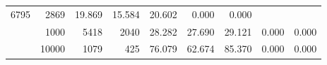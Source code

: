 \begin{table}
\begin{tabular}{rrrrrrrrr}
							     6795  & 2869  
	                           & 19.869 & 15.584 & 20.602
	                           & 0.000 & 0.000  \\
	                
	            
					 &  
					 
					\multirow{ 1 }{*}{ 1000 } &
					
						
							    
							     5418  & 2040  
	                           & 28.282 & 27.690 & 29.121
	                           & 0.000 & 0.000  \\
	                
	            
					 &  
					 
					\multirow{ 1 }{*}{ 10000 } &
					
						
							    
							     1079  & 425  
	                           & 76.079 & 62.674 & 85.370
	                           & 0.000 & 0.000  \\
	                
	            
	        

\hline

\end{tabular}
\end{table}
\clearpage


	    
	
	    

